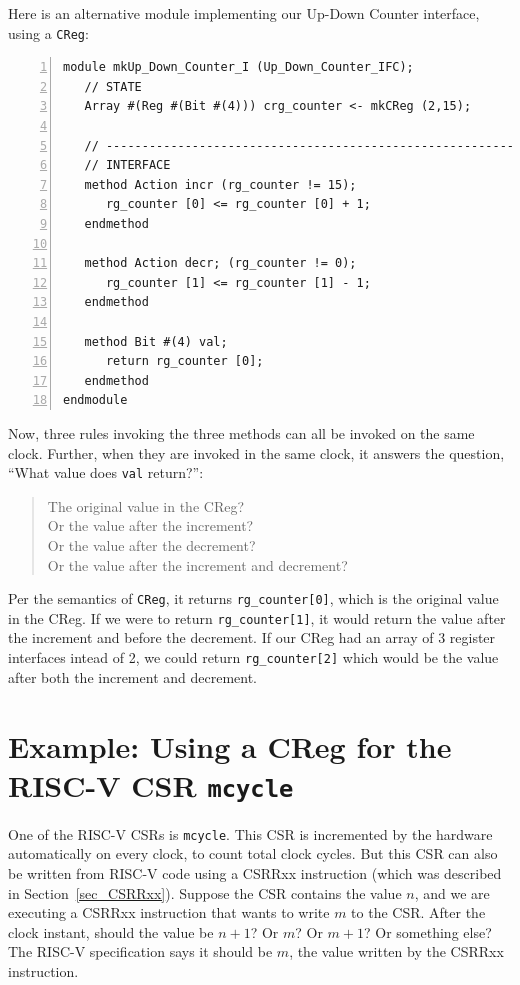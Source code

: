 Here is an alternative module implementing our Up-Down Counter
interface, using a \verb|CReg|:

{\small
\begin{Verbatim}[frame=single, numbers=left]
module mkUp_Down_Counter_I (Up_Down_Counter_IFC);
   // STATE
   Array #(Reg #(Bit #(4))) crg_counter <- mkCReg (2,15);

   // ----------------------------------------------------------------
   // INTERFACE
   method Action incr (rg_counter != 15);
      rg_counter [0] <= rg_counter [0] + 1;
   endmethod

   method Action decr; (rg_counter != 0);
      rg_counter [1] <= rg_counter [1] - 1;
   endmethod

   method Bit #(4) val;
      return rg_counter [0];
   endmethod
endmodule
\end{Verbatim}
}

Now, three rules invoking the three methods can all be invoked on the
same clock.  Further, when they are invoked in the same clock, it
answers the question, ``What value does \verb|val| return?'':

\begin{quote}
The original value in the CReg? \\
Or the value after the increment? \\
Or the value after the decrement? \\
Or the value after the increment and decrement?
\end{quote}

Per the semantics of \verb|CReg|, it returns \verb|rg_counter[0]|,
which is the original value in the CReg.  If we were to return
\verb|rg_counter[1]|, it would return the value after the increment
and before the decrement.  If our CReg had an array of 3 register
interfaces intead of 2, we could return \verb|rg_counter[2]| which
would be the value after both the increment and decrement.


\section{Example: Using a CReg for the RISC-V CSR {\tt mcycle}}

\label{Sec_CSR_mcycle}

One of the RISC-V CSRs is {\tt mcycle}.  This CSR is incremented by
the hardware automatically on every clock, to count total clock
cycles.  But this CSR can also be written from RISC-V code using a
CSRRxx instruction (which was described in Section~\ref{sec_CSRRxx}).
Suppose the CSR contains the value $n$, and we are executing a CSRRxx
instruction that wants to write $m$ to the CSR.  After the clock
instant, should the value be $n+1$? Or $m$? Or $m+1$? Or something
else?  The RISC-V specification says it should be $m$, the value
written by the CSRRxx instruction.

